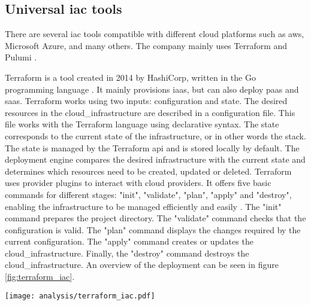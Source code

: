 \subsection{Universal \acrshort{iac} tools}
There are several \acrshort{iac} tools compatible with different \gls{cloud} platforms such as \gls{aws}, Microsoft Azure, and many others. The  company mainly uses Terraform \cite{terraform} and Pulumi \cite{pulumi}.

Terraform is a tool created in 2014 by HashiCorp, written in the Go programming language \cite{terraform_github}. It mainly provisions \acrlong{iaas}, but can also deploy \acrlong{paas} and \acrlong{saas}. Terraform works using two inputs: configuration and state. The desired resources in the \gls{cloud_infrastructure} are described in a configuration file. This file works with the Terraform language using declarative syntax. The state corresponds to the current state of the infrastructure, or in other words the stack. The state is managed by the Terraform \acrshort{api} and is stored locally by default. The deployment engine compares the desired infrastructure with the current state and determines which resources need to be created, updated or deleted. Terraform uses provider plugins to interact with \gls{cloud} providers. It offers five basic commands for different stages: "init", "validate", "plan", "apply" and "destroy", enabling the infrastructure to be managed efficiently and easily \cite{terraform}. The "init" command prepares the project directory. The "validate" command checks that the configuration is valid. The "plan" command displays the changes required by the current configuration. The "apply" command creates or updates the \gls{cloud_infrastructure}. Finally, the "destroy" command destroys the \gls{cloud_infrastructure}. An overview of the deployment can be seen in figure \ref{fig:terraform_iac}. \cite{iac_tools}
\begin{center}
    \begingroup
    \texttt{[image: analysis/terraform\_iac.pdf]}
    \label{fig:terraform_iac}
    \endgroup
\end{center}

